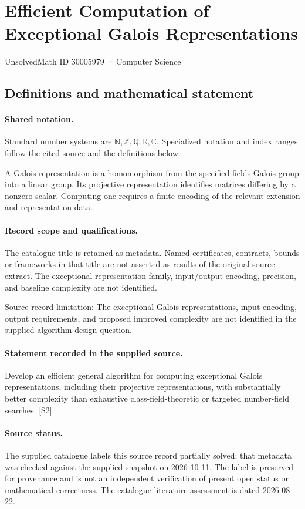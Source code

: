 \documentclass[11pt]{article}
\newcommand{\sref}[2]{\hyperlink{source:#1:#2}{[S#2]}}
\begin{document}
\setcounter{section}{30005978}
\section{Efficient Computation of Exceptional Galois Representations}\label{30005979}
{\small\sffamily UnsolvedMath ID 30005979 · Computer Science}
\subsection{Definitions and mathematical statement}

\paragraph{Shared notation.}Standard number systems are $\mathbb N,\mathbb Z,\mathbb Q,\mathbb R,\mathbb C$. Specialized notation and index ranges follow the cited source and the definitions below.


A Galois representation is a homomorphism from the specified field\textquotesingle s Galois group into a linear group. Its projective representation identifies matrices differing by a nonzero scalar. Computing one requires a finite encoding of the relevant extension and representation data.
\paragraph{Record scope and qualifications.}
The catalogue title is retained as metadata. Named certificates, contracts, bounds or frameworks in that title are not asserted as results of the original source extract.
The exceptional representation family, input/output encoding, precision, and baseline complexity are not identified.

Source-record limitation: The exceptional Galois representations, input encoding, output requirements, and proposed improved complexity are not identified in the supplied algorithm-design question.
\paragraph{Statement recorded in the supplied source.}
Develop an efficient general algorithm for computing exceptional Galois representations, including their projective representations, with substantially better complexity than exhaustive class-field-theoretic or targeted number-field searches. \sref{30005979}{2}
\paragraph{Source status.}
The supplied catalogue labels this source record partially solved; that metadata was checked against the supplied snapshot on 2026-10-11. The label is preserved for provenance and is not an independent verification of present open status or mathematical correctness. The catalogue literature assessment is dated 2026-08-22.
\end{document}
